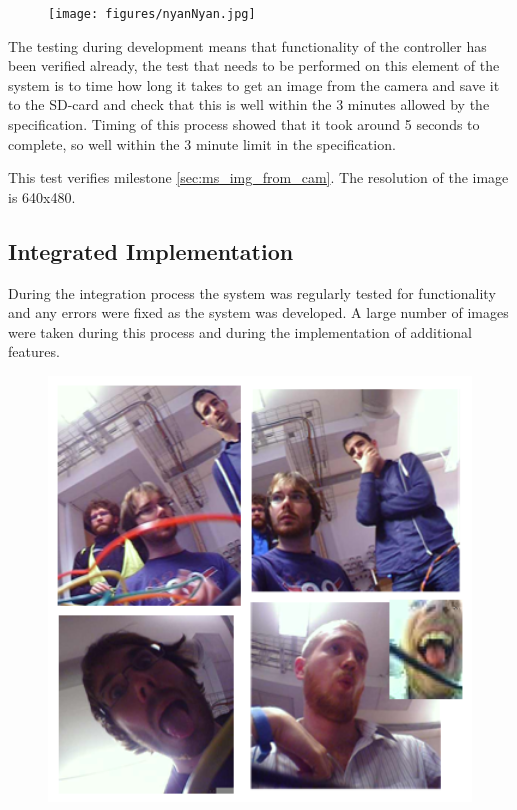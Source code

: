 \begin{figure}[H]
        \centering
        \texttt{[image: figures/nyanNyan.jpg]}
        \label{fig:Nyan1}
\end{figure}

The testing during development means that functionality of the controller has been verified already, the test that needs to be performed on this element of the system is to time how long it takes to get an image from the camera and save it to the SD-card and check that this is well within the 3 minutes allowed by the specification. Timing of this process showed that it took around 5 seconds to complete, so well within the 3 minute limit in the specification.

This test verifies milestone \ref{sec:ms_img_from_cam}. The resolution of the image is 640x480.

\subsection{Integrated Implementation}

During the integration process the system was regularly tested for functionality and any errors were fixed as the system was developed. A large number of images were taken during this process and during the implementation of additional features.

\begin{figure}[H]
        \centering
        \includegraphics[width=1.00\textwidth]{figures/SampleImages1.png}
        \label{fig:Samples1}
\end{figure}

